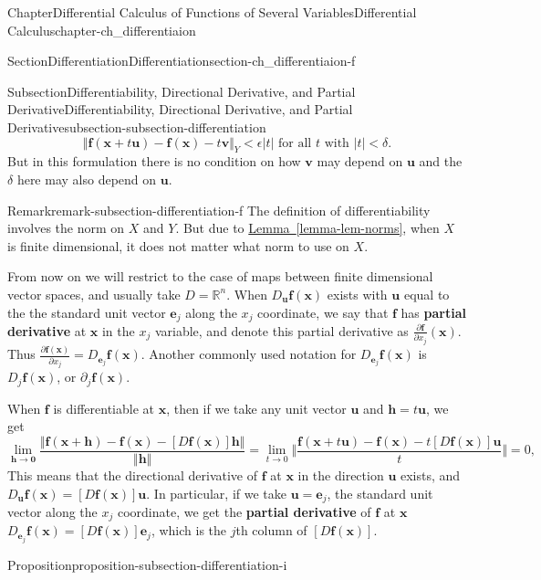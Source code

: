 \documentclass[oneside,10pt,]{book}
\newcommand{\xreffont}{\relax}
\newcommand{\terminology}[1]{\textbf{#1}}
\numberwithin{equation}{section}
\newcommand{\be}{\mathbf{e}}
\newcommand{\bff}{\mathbf{f}}
\newcommand{\bu}{\mathbf{u}}
\newcommand{\bx}{\mathbf{x}}
\newcommand{\bbR}{\mathbb{R}}
\begin{document}
\begin{chapterptx}{Chapter}{Differential Calculus of Functions of Several Variables}{}{Differential Calculus}{}{}{chapter-ch_differentiaion}
\begin{sectionptx}{Section}{Differentiation}{}{Differentiation}{}{}{section-ch_differentiaion-f}
\begin{subsectionptx}{Subsection}{Differentiability, Directional Derivative, and Partial Derivative}{}{Differentiability, Directional Derivative, and Partial Derivative}{}{}{subsection-subsection-differentiation}
\begin{equation*}
\Vert  {\mathbf f}({\mathbf x}+t{\mathbf u})- {\mathbf f}({\mathbf x})-t {\mathbf v} \Vert_{Y}
< \epsilon |t| \text{ for all } t \text{ with } |t|< \delta.
\end{equation*}
But in this formulation there is no condition on how \({\mathbf v}\) may depend on \({\mathbf u}\) and the \(\delta\) here may also depend on \({\mathbf u}\).%
\begin{remark}{Remark}{}{remark-subsection-differentiation-f}%
The definition of differentiability involves the norm on \(X\) and \(Y\). But due to \hyperref[lemma-lem-norms]{Lemma~{\xreffont\ref{lemma-lem-norms}}}, when \(X\) is finite dimensional, it does not matter what norm to use on \(X\).\end{remark}
From now on we will restrict to the case of maps between finite dimensional vector spaces, and usually take \(D=\bbR^{n}\). When \(D_{{\mathbf u}} {\mathbf f}({\mathbf x})\) exists with \(\bu\) equal to the the standard unit vector \(\be_{j}\) along the \(x_{j}\) coordinate, we say that \(\bff\) has \terminology{partial derivative} at \(\bx\) in the \(x_{j}\) variable, and denote this partial derivative as \(\frac{\partial \bff }{\partial x_{j}}(\bx)\). Thus \(\frac{\partial \bff (\bx)}{\partial x_{j}}= D_{{\mathbf e}_{j}}{\mathbf f}({\mathbf x})\). Another commonly used notation for \(D_{{\mathbf e}_{j}}{\mathbf f}({\mathbf x})\) is \(D_{j}{\mathbf f}({\mathbf x})\), or \(\partial_{j}{\mathbf f}({\mathbf x})\).%
\par
When \(\bff\) is differentiable at \(\bx\), then if we take any unit vector \(\bu\) and \({\mathbf h} =t {\mathbf u}\), we get%
\begin{equation*}
\lim_{{\mathbf h}\to {\mathbf 0}}
\frac{\Vert {\mathbf f}({\mathbf x}+{\mathbf h})- {\mathbf f}({\mathbf x})-[D\mathbf f (\bx)]{\mathbf h} \Vert}{\Vert {\mathbf h} \Vert}
=\lim_{t\to 0}
\Vert \frac{ {\mathbf f}({\mathbf x}+t{\mathbf u})- {\mathbf f}({\mathbf x})-t [D\mathbf f (\bx)]{\mathbf u} }{t} \Vert=0,
\end{equation*}
This  means that the directional derivative of \({\mathbf f}\) at \({\mathbf x}\) in the direction \({\mathbf u}\) exists, and  \(D_{{\mathbf u}} {\mathbf f}({\mathbf x})=[D\mathbf f (\bx)]\bu\).  In particular, if we take \({\mathbf u}={\mathbf e}_{j}\), the standard unit vector along the \(x_{j}\) coordinate, we get the \terminology{partial derivative} of \(\bff\) at \(\bx\) \(D_{{\mathbf e}_{j}}{\mathbf f}({\mathbf x})=[D\mathbf f (\bx)]{\mathbf e}_{j}\), which is the \(j\)th column of \([D\mathbf f (\bx)]\).%
\begin{proposition}{Proposition}{}{}{proposition-subsection-differentiation-i}%

\end{proposition}
\end{subsectionptx}
\end{sectionptx}
\end{chapterptx}
\end{document}

